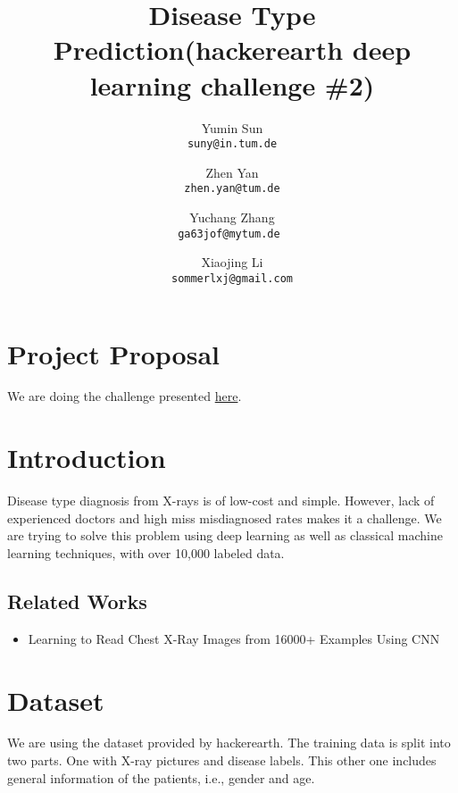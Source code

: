 \documentclass[10pt,twocolumn,letterpaper]{article}
\begin{document}
\title{Disease Type Prediction(hackerearth deep learning challenge \#2)}

\author{Yumin Sun\\
{\tt\small suny@in.tum.de}
\and
Zhen Yan\\
{\tt\small zhen.yan@tum.de}
\and
Yuchang Zhang\\
{\tt\small ga63jof@mytum.de }
\and
Xiaojing Li\\
{\tt\small sommerlxj@gmail.com}
}


\maketitle

%
%
\section*{Project Proposal}
We are doing the challenge presented \href{https://www.hackerearth.com/challenge/competitive/deep-learning-challenge-2/machine-learning/yes-a-question/}{here}.

\section{Introduction}
	Disease type diagnosis from X-rays is of low-cost and simple. However, lack of experienced doctors and high miss misdiagnosed rates makes it a challenge. We are trying to solve this problem using deep learning as well as classical machine learning techniques, with over 10,000 labeled data.
	
    \subsection{Related Works}
        \begin{itemize}
            \item Learning to Read Chest X-Ray Images from 16000+ Examples Using CNN \cite{dong2017learning}
        \end{itemize}

\section{Dataset}
We are using the dataset provided by hackerearth. The training data is split into two parts. One with X-ray pictures and disease labels. This other one includes general information of the patients, i.e., gender and age.
\end{document}
